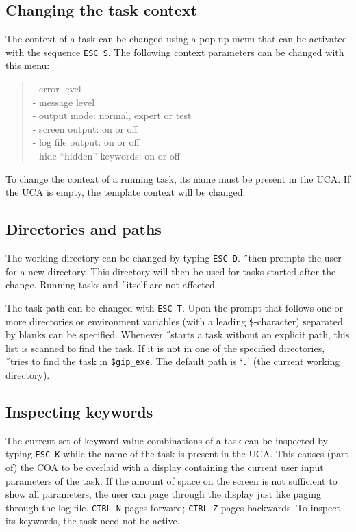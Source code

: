 \subsection*{Changing the task context}
The context of a task can be changed using a pop-up menu that can be activated
with the sequence {\tt ESC S}.
The following context parameters can be changed with this menu:
\begin{verse}
- error level\\
- message level\\
- output mode: normal, expert or test\\
- screen output: on or off\\
- log file output: on or off\\
- hide ``hidden'' keywords: on or off\\
\end{verse}
To change the context of a running task, its name must be present in the UCA.
If the UCA is empty, the template context will be changed.

\subsection*{Directories and paths}
The working directory can be changed by typing {\tt ESC D}. 
\H\ then prompts the user for a new directory.
This directory will then be used for tasks started after the change.
Running tasks and \H\ itself are not affected.

The task path can be changed with {\tt ESC T}.
Upon the prompt that follows one or more directories or environment variables
(with a leading {\tt \$}-character) separated by blanks can be specified.
Whenever \H\ starts a task without an explicit path, this list is scanned
to find the task.
If it is not in one of the specified directories, \H\ tries to find the task in
{\tt \$gip\_exe}.
The default path is `{\tt .}' (the current working directory).

\subsection*{Inspecting keywords}
The current set of keyword-value combinations of a task can be inspected by 
typing {\tt ESC K} while the name of the task is present in the UCA.
This causes (part of) the COA to be overlaid with a display containing the
current user input parameters of the task.
If the amount of space on the screen is not sufficient to show all parameters,
the user can page through the display just like paging through the log file.
{\tt CTRL-N} pages forward; {\tt CTRL-Z} pages backwards.
To inspect its keywords, the task need not be active.

